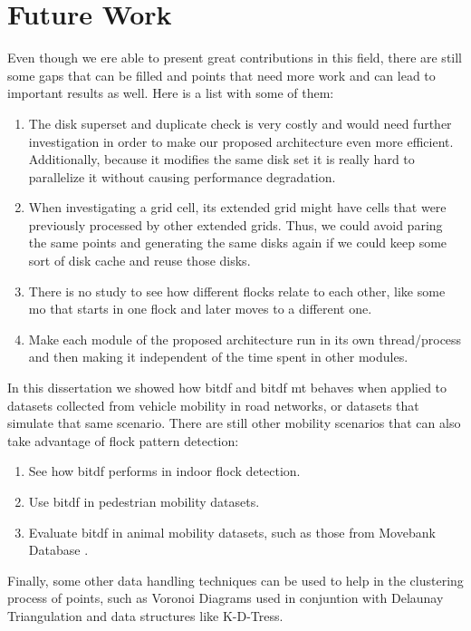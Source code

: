 \section{Future Work}
Even though we ere able to present great contributions in this field, there are still some gaps that can be filled and
points that need more work and can lead to important results as well. Here is a list with some of them:

\begin{enumerate}
    \item The disk superset and duplicate check is very costly and would need further investigation in order to make our proposed architecture even
        more efficient. Additionally, because it modifies the same disk set it is really hard to parallelize it without
        causing performance degradation.
    \item When investigating a grid cell, its extended grid might have cells that were previously processed by other
        extended grids. Thus, we could avoid paring the same points and generating the same disks again if we could keep
        some sort of disk cache and reuse those disks.
    \item There is no study to see how different flocks relate to each other, like some \ac{mo} that starts in one flock
        and later moves to a different one.
    \item Make each module of the proposed architecture run in its own thread/process and then making it independent of
        the time spent in other modules.
\end{enumerate}

In this dissertation we showed how \ac{bitdf} and \ac{bitdf} \ac{mt} behaves when applied to datasets collected from
vehicle mobility in road networks, or datasets that simulate that same scenario. There are still other mobility
scenarios that can also take advantage of flock pattern detection:

\begin{enumerate}
    \item See how \ac{bitdf} performs in indoor flock detection.
    \item Use \ac{bitdf} in pedestrian mobility datasets.
    \item Evaluate \ac{bitdf} in animal mobility datasets, such as those from Movebank Database \citep{movebank}.
\end{enumerate}

Finally, some other data handling techniques can be used to help in the clustering process of points, such as Voronoi
Diagrams used in conjuntion with Delaunay Triangulation and data structures like K-D-Tress.


